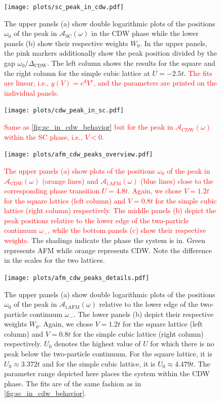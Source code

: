 \documentclass[
    reprint, 
    aps,
    preprintnumbers,
    twocolumn,
    prb,
    superscriptaddress
]{revtex4-2}
\newcommand{\spectral}[1]{\mathcal{A}_\text{#1}  (\omega)}
\begin{document}
\begin{figure}
    \centering
    \texttt{[image: plots/sc\_peak\_in\_cdw.pdf]}
    \caption{The upper panels (a) show double logarithmic plots of the positions $\omega_0$ of the peak in $\spectral{SC}$ in the CDW phase while the lower panels (b) show their respective weights $W_0$.
    In the upper panels, the pink markers additionally show the peak position divided by the gap $\omega_0 / \Delta_\text{CDW}$.
    The left column shows the results for the square and the right column for the simple cubic lattice at $U=-2.5t$.
    \textcolor{red}{The fits are linear, i.e., $y(V) = e^d V^c$, and the parameters are printed on the individual panels.}}
    \label{fig:sc_in_cdw_behavior}
\end{figure}

\begin{figure}
    \centering
    \texttt{[image: plots/cdw\_peak\_in\_sc.pdf]}
    \caption{\textcolor{red}{Same as \autoref{fig:sc_in_cdw_behavior} but for the peak in $\spectral{CDW}$ within the SC phase, i.e., $V<0$.}}
    \label{fig:cdw_in_sc_behavior}
\end{figure}

\begin{figure}
    \centering
    \texttt{[image: plots/afm\_cdw\_peaks\_overview.pdf]}
    \caption{\textcolor{red}{The upper panels (a) show plots of the positions $\omega_0$ of the peak in $\spectral{CDW}$ (orange lines) and $\spectral{l.AFM}$ (blue lines) close to the corresponding phase transition $U = 4.8t$.
    Again, we chose $V=1.2t$ for the square lattice (left column) and $V=0.8t$ for the simple cubic lattice (right column) respectively.
    The middle panels (b) depict the peak positions relative to the lower edge of the two-particle continuum $\omega_-$, while the bottom panels (c) show their respective weights.}
    The shadings indicate the phase the system is in. Green represents AFM while orange represents CDW.
    Note the difference in the scales for the two lattices.}
    \label{fig:afm_cdw_peaks_overview}
\end{figure}

\begin{figure}
    \centering
    \texttt{[image: plots/afm\_cdw\_peaks\_details.pdf]}
    \caption{The upper panels (a) show double logarithmic plots of the positions $\omega_0$ of the peak in $\spectral{l.AFM}$ relative to the lower edge of the two-particle continuum $\omega_-$.
    The lower panels (b) depict their respective weights $W_0$.
    Again, we chose $V=1.2t$ for the square lattice (left column) and $V=0.8t$ for the simple cubic lattice (right column) respectively.
    $U_0$ denotes the highest value of $U$ for which there is no peak below the two-particle continuum.
    For the square lattice, it is $U_0 \approx 3.372t$ and for the simple cubic lattice, it is $U_0 \approx 4.479t$.
    The parameter range depicted here places the system within the CDW phase.
    The fits are of the same fashion as in \autoref{fig:sc_in_cdw_behavior}.}
    \label{fig:afm_cdw_peaks_details}
\end{figure}
\end{document}
